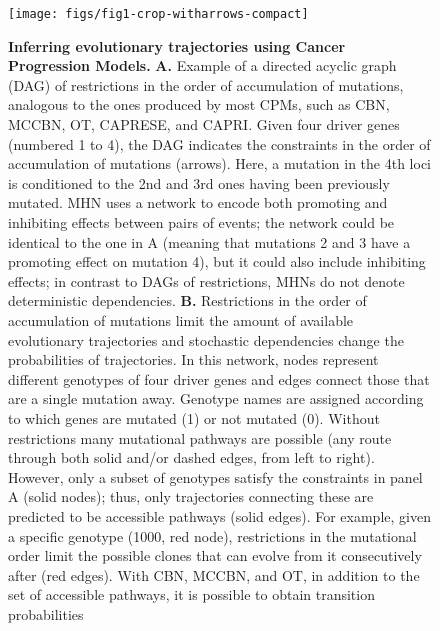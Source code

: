 \documentclass[a4paper,10pt]{article}
\begin{document}
\begin{figure}[H]
	\centering
        \texttt{[image: figs/fig1-crop-witharrows-compact]}
	\internallinenumbers
	\caption[Inferring evolutionary trajectories using Cancer
        Progression Models.]{\textbf{Inferring evolutionary trajectories
            using Cancer Progression Models.} \textbf{A.} Example of a
          directed acyclic graph (DAG) of restrictions in the order of
          accumulation of mutations, analogous to the ones produced by
          most CPMs, such as CBN, MCCBN, OT, CAPRESE, and CAPRI. Given
          four driver genes (numbered 1 to 4), the DAG indicates the
          constraints in the order of accumulation of mutations
          (arrows). Here, a mutation in the 4th loci is conditioned to the
          2nd and 3rd ones having been previously mutated.  MHN uses a
          network to encode both promoting and inhibiting effects between
          pairs of events; the network could be identical to the one in A
          (meaning that mutations 2 and 3 have a promoting effect on
          mutation 4), but it could also include inhibiting effects; in
          contrast to DAGs of restrictions, MHNs do not denote
          deterministic dependencies.  \textbf{B.} Restrictions in the
          order of accumulation of mutations limit the amount of available
          evolutionary
          trajectories and stochastic dependencies change the
          probabilities of trajectories.  In this network, nodes represent
          different genotypes of four driver genes and edges connect those
          that are a single mutation away. Genotype names are assigned
          according to which genes are mutated (1) or not mutated
          (0). Without restrictions many mutational pathways are possible
          (any route through both solid and/or dashed edges, from left to
          right).  However, only a subset of genotypes satisfy the
          constraints in panel A (solid nodes); thus, only trajectories
          connecting these are predicted to be accessible pathways (solid
          edges). For example, given a specific genotype (1000, red node),
          restrictions in the mutational order limit the possible clones
          that can evolve from it consecutively after (red edges). With
          CBN, MCCBN, and OT, in addition to the set of accessible
          pathways, it is possible to obtain transition probabilities
}
\end{figure}
\end{document}
